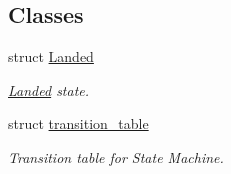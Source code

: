 \subsection*{Classes}
\begin{DoxyCompactItemize}
\item 
struct \hyperlink{structLogicStateMachineFrontEnd_1_1Landed}{Landed}
\begin{DoxyCompactList}\small\item\em \hyperlink{structLogicStateMachineFrontEnd_1_1Landed}{Landed} state. \end{DoxyCompactList}\item 
struct \hyperlink{structLogicStateMachineFrontEnd_1_1transition__table}{transition\-\_\-table}
\begin{DoxyCompactList}\small\item\em Transition table for State Machine. \end{DoxyCompactList}\end{DoxyCompactItemize}
